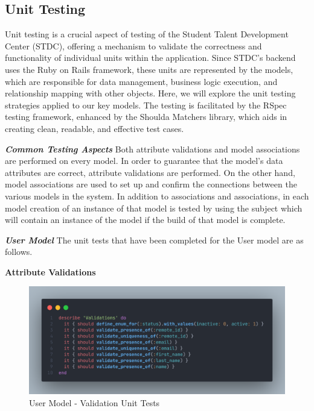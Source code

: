 \subsection{Unit Testing}
\begin{justify}
Unit testing is a crucial aspect of testing of the Student Talent Development Center (STDC), offering a mechanism to validate the correctness and functionality of individual units within the application. Since STDC's backend uses the Ruby on Rails framework, these units are represented by the models, which are responsible for data management, business logic execution, and relationship mapping with other objects. Here, we will explore the unit testing strategies applied to our key models. The testing is facilitated by the RSpec testing framework, enhanced by the Shoulda Matchers library, which aids in creating clean, readable, and effective test cases.

\vspace{0.25cm}
\newendline \textbf{\textit{Common Testing Aspects}}\newendline
Both attribute validations and model associations are performed on every model. In order to guarantee that the model's data attributes are correct, attribute validations are performed. On the other hand, model associations are used to set up and confirm the connections between the various models in the system. In addition to associations and associations, in each model creation of an instance of that model is tested by using the subject which will contain an instance of the model if the build of that model is complete.



\vspace{0.25cm}
\newendline \textbf{\textit{User Model}}\newendline
The unit tests that have been completed for the User model are as follows.

\vspace{0.25cm}
\newendline
\textbf{Attribute Validations}

    \begin{figure}[H]
        \centerline{\includegraphics[width=140mm,scale=1]{figures/implementation_and_testing/testing/AUT/user/validations.png}}
        \caption{User Model - Validation Unit Tests}
        \label{User Model - Validation Unit Tests}
    \end{figure}



\end{justify}
